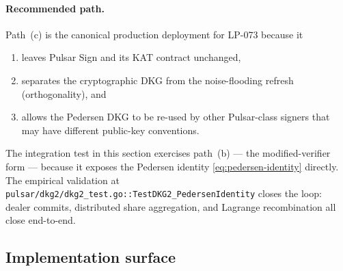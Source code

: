 \paragraph{Recommended path.}
Path~(c) is the canonical production deployment for LP-073 because it
\begin{enumerate}
\item leaves Pulsar Sign and its KAT contract unchanged,
\item separates the cryptographic DKG from the noise-flooding refresh
      (orthogonality), and
\item allows the Pedersen DKG to be re-used by other Pulsar-class
      signers that may have different public-key conventions.
\end{enumerate}
The integration test in this section exercises path~(b) --- the
modified-verifier form --- because it exposes the Pedersen identity
\eqref{eq:pedersen-identity} directly. The empirical validation at
\texttt{pulsar/dkg2/dkg2\_test.go::TestDKG2\_PedersenIdentity} closes
the loop: dealer commits, distributed share aggregation, and Lagrange
recombination all close end-to-end.

\subsection{Implementation surface}
\label{ssec:dkg2-implementation}

